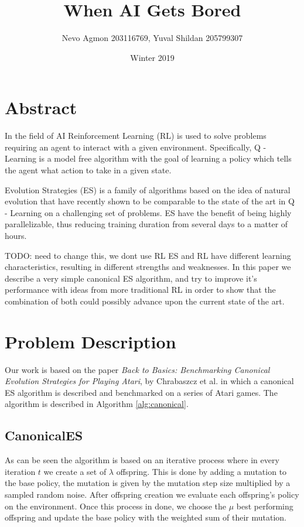 \documentclass[11 pt, twocolumn]{article}
\title{When AI Gets Bored}
\author{Nevo Agmon 203116769, Yuval Shildan 205799307}
\date{Winter 2019}
\newcommand{\todo}[1]{{\color{red} TODO: {#1}}}
\begin{document}
\maketitle
\section{Abstract}
In the field of AI Reinforcement Learning (RL) is used to solve problems requiring an agent to interact with a given environment. Specifically, Q - Learning is a model free algorithm with the goal of learning a policy which tells the agent what action to take in a given state.

Evolution Strategies (ES) is a family of algorithms based on the idea of natural evolution that have recently shown to be comparable to the state of the art in Q - Learning on a challenging set of problems. ES have the benefit of being highly parallelizable, thus reducing training duration from several days to a matter of hours.

\todo{need to change this, we dont use RL} ES and RL have different learning characteristics, resulting in different strengths and weaknesses. In this paper we describe a very simple canonical ES algorithm, and try to improve it's performance with ideas from more traditional RL in order to show that the combination of both could possibly advance upon the current state of the art.


\section{Problem Description}
Our work is based on the paper \emph{Back to Basics: Benchmarking Canonical Evolution Strategies for  Playing Atari}, by Chrabaszcz et al. \cite{canonical} in which a canonical ES algorithm is described and benchmarked on a series of Atari games. The algorithm is described in Algorithm \ref{alg:canonical}.

\subsection{CanonicalES}
As can be seen the algorithm is based on an iterative process where in every iteration $t$ we create a set of $\lambda$ offspring. This is done by adding a mutation to the base policy, the mutation is given by the mutation step size multiplied by a sampled random noise. After offspring creation we evaluate each offspring's policy on the environment. Once this process in done, we choose the $\mu$ best performing offspring and update the base policy with the weighted sum of their mutation.
\end{document}

